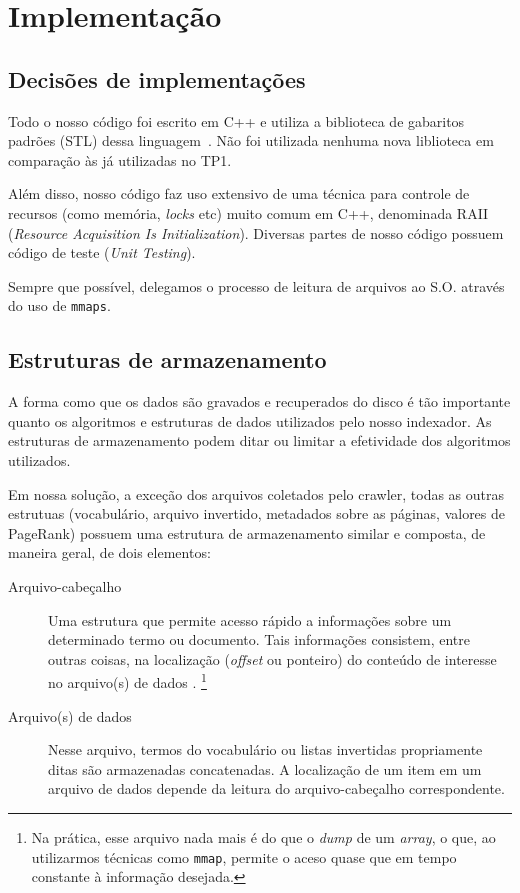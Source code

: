 \documentclass[10pt,twocolumn]{article}
\begin{document}

\section{Implementação}\label{sec:implementation}

\subsection{Decisões de implementações}

Todo o nosso código foi escrito em C++
e utiliza a biblioteca de gabaritos padrões (STL) dessa
linguagem~\cite{stroustrup97}.
Não foi utilizada nenhuma nova liblioteca em comparação às já utilizadas
no TP1.

Além disso, nosso código faz uso extensivo de uma técnica para controle
de recursos (como memória, \emph{locks} etc)  muito comum em C++,
denominada RAII (\emph{Resource Acquisition Is Initialization}).
Diversas partes de nosso código possuem código de teste (\emph{Unit
Testing}).

Sempre que possível, delegamos o processo de leitura de
arquivos ao S.O. através do uso de \texttt{mmaps}.

\subsection{Estruturas de armazenamento}\label{sec:storage}

A forma como que os dados são gravados e recuperados do disco é
tão importante quanto os algoritmos e estruturas de dados utilizados
pelo nosso indexador. As estruturas de armazenamento podem ditar ou
limitar a efetividade dos algoritmos utilizados.

Em nossa solução, a exceção dos arquivos coletados pelo crawler, todas
as outras estrutuas (vocabulário, arquivo invertido, metadados sobre as
páginas, valores de PageRank) possuem uma estrutura
de armazenamento similar e composta, de maneira geral, de dois
elementos:
\begin{description}

\item[Arquivo-cabeçalho] Uma estrutura que permite acesso rápido a
informações sobre um determinado termo ou documento.  Tais informações
consistem, entre outras coisas, na localização (\emph{offset} ou
ponteiro) do conteúdo de interesse no arquivo(s) de dados . \footnote{
Na prática, esse arquivo nada mais é do que o \emph{dump} de um
\emph{array}, o que, ao utilizarmos técnicas como \texttt{mmap}, permite
o aceso quase que em tempo constante à informação desejada.}

\item[Arquivo(s) de dados] Nesse arquivo, termos do vocabulário ou listas
invertidas propriamente ditas são armazenadas concatenadas. A
localização de um item em um arquivo de dados depende da leitura do
arquivo-cabeçalho correspondente.
\end{description}
\end{document}
